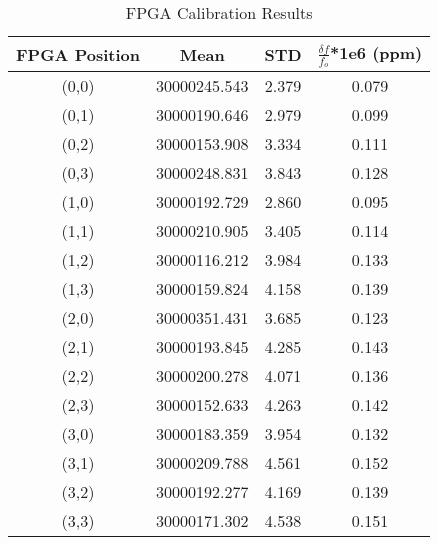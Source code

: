 \begin{table}
	\begin{center}
		\begin{tabular}{|c|c|c|c|}
			\hline
			FPGA Position & Mean & STD & $\frac{\delta f}{f_{o}}$*1e6 (ppm) \\
			\hline
			(0,0) & 30000245.543 & 2.379 & 0.079 \\
			\hline
			(0,1) & 30000190.646 & 2.979 & 0.099 \\
			\hline
			(0,2) & 30000153.908 & 3.334 & 0.111 \\
			\hline
			(0,3) & 30000248.831 & 3.843 & 0.128 \\
			\hline
			(1,0) & 30000192.729 & 2.860 & 0.095 \\
			\hline
			(1,1) & 30000210.905 & 3.405 & 0.114 \\
			\hline
			(1,2) & 30000116.212 & 3.984 & 0.133 \\
			\hline
			(1,3) & 30000159.824 & 4.158 & 0.139 \\
			\hline
			(2,0) & 30000351.431 & 3.685 & 0.123 \\
			\hline
			(2,1) & 30000193.845 & 4.285 & 0.143 \\
			\hline
			(2,2) & 30000200.278 & 4.071 & 0.136 \\
			\hline
			(2,3) & 30000152.633 & 4.263 & 0.142 \\
			\hline
			(3,0) & 30000183.359 & 3.954 & 0.132 \\
			\hline
			(3,1) & 30000209.788 & 4.561 & 0.152 \\
			\hline
			(3,2) & 30000192.277 & 4.169 & 0.139 \\
			\hline
			(3,3) & 30000171.302 & 4.538 & 0.151 \\
			\hline
		\end{tabular}
	\end{center}
	\caption{FPGA Calibration Results}
	\label{tab:fpga_calibration}
\end{table}